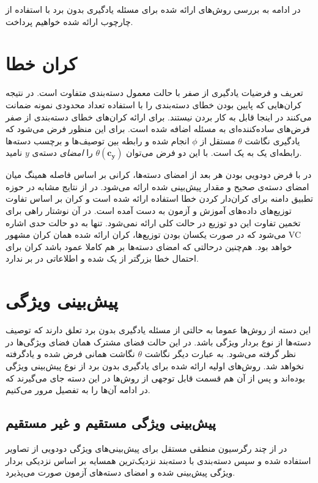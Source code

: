    

در ادامه به بررسی روش‌های ارائه شده برای مسئله یادگیری بدون برد با استفاده از چارچوب ارائه شده خواهیم پرداخت.

\section{کران خطا}\label{bound}
تعریف و فرضیات یادگیری از صفر با حالت معمول دسته‌بندی متفاوت است. در نتیجه کران‌هایی که پایین بودن خطای دسته‌بندی را با استفاده تعداد محدودی نمونه ضمانت می‌کنند در اینجا قابل به کار بردن نیستند. برای ارائه کران‌های خطای دسته‌بندی از صفر فرض‌های ساده‌کننده‌ای به مسئله اضافه شده است. برای این منظور فرض می‌شود که یادگیری نگاشت 
$\theta$
 مستقل از $\phi$ انجام شده و رابطه بین توصیف‌ها و برچسب دسته‌ها رابطه‌ای یک به یک است. با این دو فرض می‌توان
  $\theta(\mathbf{c_y} ) $
   را \emph{ امضای}  دسته‌ی $y$ نامید. 

در \cite{hinton09} با فرض دودویی بودن هر بعد از امضای دسته‌ها، کرانی  بر اساس فاصله همینگ 
میان امضای دسته‌ی صحیح و مقدار پیش‌بینی شده ارائه می‌شود. در \cite{emb15} از نتایج مشابه در حوزه تطبیق دامنه برای کران‌دار کردن خطا استفاده ارائه شده است و کران بر اساس تفاوت توزیع‌های داده‌های آموزش و آزمون به دست آمده است. در آن نوشتار راهی برای تخمین تفاوت این دو توزیع در حالت کلی ارائه نمی‌شود. تنها به دو حالت حدی اشاره می‌شود که در صورت یکسان بودن توزیع‌ها، کران ارائه شده همان کران مشهور VC \cite{vapnik} خواهد بود. هم‌چنین درحالتی که امضای دسته‌ها بر هم کاملا عمود باشد کران برای احتمال خطا بزرگتر از یک شده و اطلاعاتی در بر ندارد. 
\section{پیش‌بینی ویژگی  }
این دسته از روش‌ها عموما به حالتی از مسئله یادگیری بدون برد تعلق دارند که توصیف دسته‌ها از نوع بردار ویژگی باشد. در این حالت فضای مشترک همان فضای ویژگی‌ها در نظر گرفته می‌شود. به عبارت دیگر نگاشت $\theta$ نگاشت همانی فرض شده و یادگرفته نخواهد شد. روش‌های اولیه ارائه شده برای یادگیری بدون برد از نوع پیش‌بینی ویژگی
بوده‌اند و پس از آن‌ هم قسمت قابل توجهی از روش‌ها در این دسته جای می‌گیرند که در ادامه آن‌ها را به تفصیل مرور می‌کنیم.

\subsection{پیش‌بینی ویژگی مستقیم و غیر مستقیم}
در \cite{hinton09} از چند رگرسیون منطقی  مستقل برای پیش‌بینی‌های ویژگی دودویی از تصاویر  استفاده شده و سپس دسته‌بندی با دسته‌بند نزدیک‌ترین همسایه بر اساس نزدیکی بردار ویژگی پیش‌بینی شده و امضای دسته‌های آزمون صورت می‌پذیرد.

